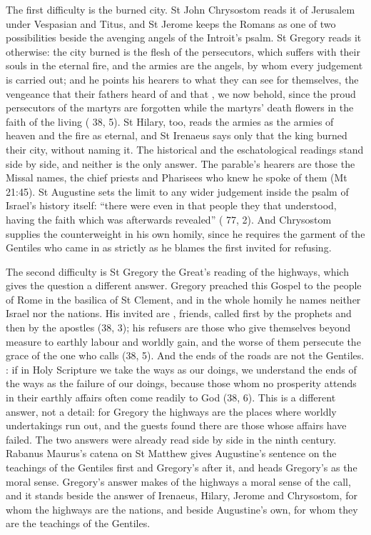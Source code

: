 The first difficulty is the burned city. St John Chrysostom reads it of
Jerusalem under Vespasian and Titus, and St Jerome keeps the Romans as one of
two possibilities beside the avenging angels of the Introit's psalm. St Gregory
reads it otherwise: the city burned is the flesh of the persecutors, which
suffers with their souls in the eternal fire, and the armies are the angels,
by whom every judgement is carried out; and he points his hearers to what
they can see for themselves, the vengeance that their fathers heard of and
that , we now behold, since the proud persecutors
of the martyrs are forgotten while the martyrs' death flowers in the faith of
the living ( 38, 5). St Hilary, too, reads the armies as the armies
of heaven and the fire as eternal, and St Irenaeus says only that the king
burned their city, without naming it. The historical and the eschatological
readings stand side by side, and neither is the only answer. The parable's
hearers are those the Missal names, the chief priests and Pharisees who knew
he spoke of them (Mt 21:45). St Augustine sets the limit to any wider judgement
inside the psalm of Israel's history itself: ``there were even in that people
they that understood, having the faith which was afterwards revealed''
( 77, 2). And Chrysostom supplies the counterweight in his own homily, since he requires
the garment of the Gentiles who came in as strictly as he blames the first
invited for refusing.

The second difficulty is St Gregory the Great's reading of the highways, which gives the question a different answer. Gregory preached this
Gospel to the people of Rome in the basilica of St Clement, and in the whole
homily he names neither Israel nor the nations. His invited are ,
friends, called first by the prophets and then by the apostles (38, 3); his
refusers are those who give themselves beyond measure to earthly labour and
worldly gain, and the worse of them persecute the grace of the one who calls
(38, 5). And the ends of the roads are not the Gentiles. : if in Holy Scripture we take the ways as our doings, we
understand the ends of the ways as the failure of our doings, because those
whom no prosperity attends in their earthly affairs often come readily to God
(38, 6). This is a different answer, not a detail: for Gregory the highways
are the places where worldly undertakings run out, and the guests found there
are those whose affairs have failed. The two answers were already read side by
side in the ninth century. Rabanus Maurus's catena on St Matthew gives
Augustine's sentence on the teachings of the Gentiles first and Gregory's after
it, and heads Gregory's as the moral sense. Gregory's answer makes of the
highways a moral sense of the call, and it stands beside the answer of
Irenaeus, Hilary, Jerome and Chrysostom, for whom the highways are the nations,
and beside Augustine's own, for whom they are the teachings of the Gentiles.

